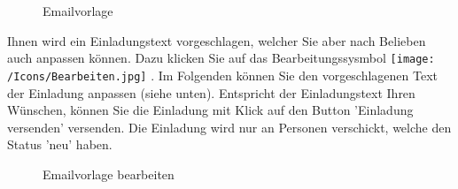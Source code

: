 \begin{figure}[H]
\caption{Emailvorlage}
\end{figure}

Ihnen wird ein Einladungstext vorgeschlagen, welcher Sie aber nach Belieben auch anpassen können. Dazu klicken Sie auf das Bearbeitungssysmbol \texttt{[image: /Icons/Bearbeiten.jpg]} . Im Folgenden können Sie den vorgeschlagenen Text der Einladung anpassen (siehe unten). Entspricht der Einladungstext Ihren Wünschen, können Sie die Einladung mit Klick auf den Button 'Einladung versenden'  versenden. Die Einladung wird nur an Personen verschickt, welche den Status 'neu' haben.

\begin{figure}[H]
\caption{Emailvorlage bearbeiten}
\end{figure}

